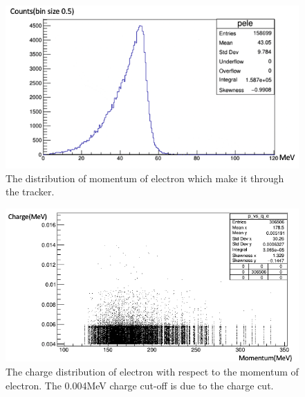 \documentclass[12pt]{extarticle}
\begin{document}
\begin{figure}[H]
\centering
\includegraphics[width=1\linewidth]{figure/reconstructed_electron_momentum.png}
\caption{The distribution of momentum of electron which make it through the tracker.}
\label{generated_e_p}
\end{figure}

\begin{figure}[H]
\centering
\includegraphics[width=1\linewidth]{figure/Momentum_electron_charge.png}
\caption{The charge distribution of electron with respect to the momentum of electron. The 0.004MeV charge cut-off is due to the charge cut.}
\label{generated_e_p_Q}
\end{figure}
\end{document}
